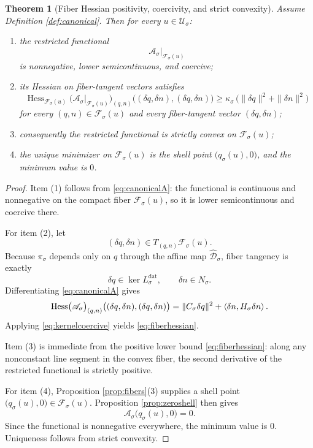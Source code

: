 \documentclass[11pt]{article}
\newcommand{\DataProj}[1]{\pi_{#1}}
\newcommand{\Fiber}[1]{\mathcal F_{#1}}
\newcommand{\StationaryFunctional}[1]{\mathscr A_{#1}}
\newcommand{\DeepSpace}[1]{\mathcal U_{#1}}
\newcommand{\NormalSpace}[1]{N_{#1}}
\newcommand{\AffineData}[1]{\widehat{\mathcal D}_{#1}}
\newcommand{\ConstraintMap}[1]{C_{#1}}
\newcommand{\NormalOperator}[1]{H_{#1}}
\newcommand{\LinearData}[1]{L_{#1}^{\mathrm{dat}}}
\newtheorem{theorem}{Theorem}
\begin{document}
\begin{theorem}[Fiber Hessian positivity, coercivity, and strict convexity]
\label{thm:convexity}
Assume Definition \ref{def:canonical}. Then for every \(u\in\DeepSpace{\sigma}\):
\begin{enumerate}
    \item the restricted functional
    \[
    \StationaryFunctional{\sigma}\big|_{\Fiber{\sigma}(u)}
    \]
    is nonnegative, lower semicontinuous, and coercive;
    \item its Hessian on fiber-tangent vectors satisfies
    \begin{equation}
    \operatorname{Hess}_{\Fiber{\sigma}(u)}
    \bigl(
    \StationaryFunctional{\sigma}\big|_{\Fiber{\sigma}(u)}
    \bigr)_{(q,n)}
    \bigl((\delta q,\delta n),(\delta q,\delta n)\bigr)
    \ge
    \kappa_{\sigma}\,
    \bigl(
    \|\delta q\|^{2}+\|\delta n\|^{2}
    \bigr)
    \label{eq:fiberhessian}
    \end{equation}
    for every \((q,n)\in\Fiber{\sigma}(u)\) and every fiber-tangent vector \((\delta q,\delta n)\);
    \item consequently the restricted functional is strictly convex on \(\Fiber{\sigma}(u)\);
    \item the unique minimizer on \(\Fiber{\sigma}(u)\) is the shell point \(\bigl(q_{\sigma}(u),0\bigr)\), and the minimum value is \(0\).
\end{enumerate}
\end{theorem}

\begin{proof}
Item (1) follows from \eqref{eq:canonicalA}: the functional is continuous and nonnegative on the compact fiber \(\Fiber{\sigma}(u)\), so it is lower semicontinuous and coercive there.

For item (2), let
\[
(\delta q,\delta n)\in T_{(q,n)}\Fiber{\sigma}(u).
\]
Because \(\DataProj{\sigma}\) depends only on \(q\) through the affine map \(\AffineData{\sigma}\), fiber tangency is exactly
\[
\delta q\in\ker\LinearData{\sigma},
\qquad
\delta n\in\NormalSpace{\sigma}.
\]
Differentiating \eqref{eq:canonicalA} gives
\[
\operatorname{Hess}
\bigl(
\StationaryFunctional{\sigma}
\bigr)_{(q,n)}
\bigl((\delta q,\delta n),(\delta q,\delta n)\bigr)
=
\|\ConstraintMap{\sigma}\delta q\|^{2}
+
\ev{\delta n,\NormalOperator{\sigma}\delta n}.
\]
Applying \eqref{eq:kernelcoercive} yields \eqref{eq:fiberhessian}.

Item (3) is immediate from the positive lower bound \eqref{eq:fiberhessian}: along any nonconstant line segment in the convex fiber, the second derivative of the restricted functional is strictly positive.

For item (4), Proposition \ref{prop:fibers}(3) supplies a shell point \(\bigl(q_{\sigma}(u),0\bigr)\in\Fiber{\sigma}(u)\). Proposition \ref{prop:zeroshell} then gives
\[
\StationaryFunctional{\sigma}\bigl(q_{\sigma}(u),0\bigr)=0.
\]
Since the functional is nonnegative everywhere, the minimum value is \(0\). Uniqueness follows from strict convexity.
\end{proof}
\end{document}
